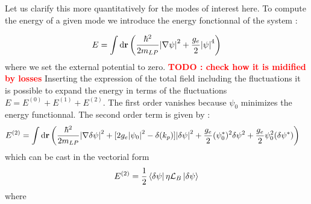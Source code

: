 Let us clarify this more quantitatively for the modes of interest here. To compute the energy of a given mode we introduce
the energy fonctionnal of the system \cite{castin_bose-einstein_2001}:

\begin{equation}
    \begin{aligned}
        E &= \int \mathrm{d}\mathbf{r} \left(\dfrac{\hbar^2}{2m_{LP}}\abs{\nabla\psi}^2 + \dfrac{g_e}{2}\abs{\psi}^4\right) \\
    \end{aligned}
\end{equation}
where we set the external potential to zero.
\textcolor{red}{\textbf{TODO : check how it is midified by losses}}
Inserting the expression of the total field including the fluctuations it is possible to expand the energy in terms of the fluctuations  
$E=E^{(0)}+E^{(1)}+E^{(2)}$. The first order vanishes because $\psi_0$ minimizes the energy functionnal. The second order term is given by :
\begin{equation}
    \begin{aligned}
        E^{(2)} &= \int \mathrm{d}\mathbf{r} \left(\dfrac{\hbar^2}{2m_{LP}}\abs{\nabla\delta\psi}^2 +[2g_e\abs{\psi_0}^2-\delta(k_p)]\abs{\delta\psi}^2+\dfrac{g_e}{2}(\psi_0^*)^2\delta\psi^2+ \dfrac{g_e}{2}\psi_0^2(\delta\psi^*)\right)
    \end{aligned}
\end{equation}
which can be cast in the vectorial form 
\begin{equation}
    E^{(2)} = \dfrac{1}{2}\bra{\delta\psi} \eta\mathcal{L}_B\ket{\delta\psi}
\end{equation}
 where 

